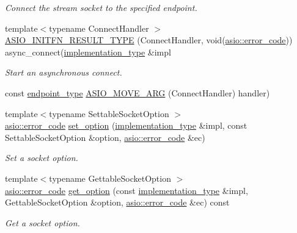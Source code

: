 \begin{DoxyCompactItemize}
\begin{DoxyCompactList}\small\item\em Connect the stream socket to the specified endpoint. \end{DoxyCompactList}\item 
{\footnotesize template$<$typename Connect\+Handler $>$ }\\\hyperlink{classasio_1_1stream__socket__service_a8902c47818d335ac74e7f57832949c6f}{A\+S\+I\+O\+\_\+\+I\+N\+I\+T\+F\+N\+\_\+\+R\+E\+S\+U\+L\+T\+\_\+\+T\+Y\+P\+E} (Connect\+Handler, void(\hyperlink{classasio_1_1error__code}{asio\+::error\+\_\+code})) async\+\_\+connect(\hyperlink{classasio_1_1stream__socket__service_a3e2c55b4aaf6bab6dfa83c8dbf5b236a}{implementation\+\_\+type} \&impl
\begin{DoxyCompactList}\small\item\em Start an asynchronous connect. \end{DoxyCompactList}\item 
const \hyperlink{classasio_1_1stream__socket__service_a02567f4db6df303c08c6dadc09e76273}{endpoint\+\_\+type} \hyperlink{classasio_1_1stream__socket__service_a87c42cfc3e2da31aa1ae89a56270b3c3}{A\+S\+I\+O\+\_\+\+M\+O\+V\+E\+\_\+\+A\+R\+G} (Connect\+Handler) handler)
\item 
{\footnotesize template$<$typename Settable\+Socket\+Option $>$ }\\\hyperlink{classasio_1_1error__code}{asio\+::error\+\_\+code} \hyperlink{classasio_1_1stream__socket__service_a7b2cfa5c8f3bb46a12966f2856efce0c}{set\+\_\+option} (\hyperlink{classasio_1_1stream__socket__service_a3e2c55b4aaf6bab6dfa83c8dbf5b236a}{implementation\+\_\+type} \&impl, const Settable\+Socket\+Option \&option, \hyperlink{classasio_1_1error__code}{asio\+::error\+\_\+code} \&ec)
\begin{DoxyCompactList}\small\item\em Set a socket option. \end{DoxyCompactList}\item 
{\footnotesize template$<$typename Gettable\+Socket\+Option $>$ }\\\hyperlink{classasio_1_1error__code}{asio\+::error\+\_\+code} \hyperlink{classasio_1_1stream__socket__service_a0c9b7e5f1d7aa329a75eb162196ea0cf}{get\+\_\+option} (const \hyperlink{classasio_1_1stream__socket__service_a3e2c55b4aaf6bab6dfa83c8dbf5b236a}{implementation\+\_\+type} \&impl, Gettable\+Socket\+Option \&option, \hyperlink{classasio_1_1error__code}{asio\+::error\+\_\+code} \&ec) const 
\begin{DoxyCompactList}\small\item\em Get a socket option. \end{DoxyCompactList}\item 

\end{DoxyCompactItemize}
